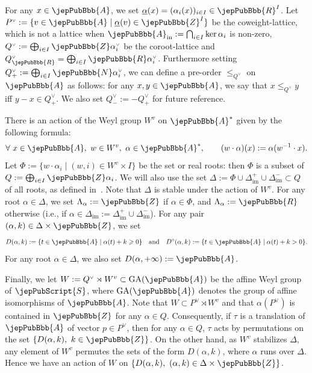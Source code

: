 For any $x\in\jepPubBbb{A}$, we set $\underline{\alpha}(x)=(\alpha_i(x))_{i\in I}\in\jepPubBbb{R}^I$. Let $P^{\scriptscriptstyle\vee}:=\{v\in\jepPubBbb{A}\mid\underline{\alpha}(v)\in\jepPubBbb{Z}^I\}$ be the coweight-lattice, which is not a lattice when $\jepPubBbb{A}_{\mathrm{in}}:=\bigcap_{i\in I}\ker\alpha_i$ is non-zero, $Q^{\scriptscriptstyle\vee}:=\bigoplus_{i\in I}\jepPubBbb{Z}\alpha_i^{\scriptscriptstyle\vee}$ be the coroot-lattice and $Q^{\scriptscriptstyle\vee}_{\jepPubBbb{R}}=\bigoplus_{i\in I}\jepPubBbb{R}\alpha_i^{\scriptscriptstyle\vee}$. Furthermore setting $Q^{\scriptscriptstyle\vee}_+:=\bigoplus_{i\in I}\jepPubBbb{N}\alpha_i^{\scriptscriptstyle\vee}$, we can define a pre-order $\leqslant_{Q^{\scriptscriptstyle\vee}}$ on $\jepPubBbb{A}$ as follows: for any $x,y\in\jepPubBbb{A}$, we say that $x\leqslant_{Q^{\scriptscriptstyle\vee}}y$ iff $y-x\in Q^{\scriptscriptstyle\vee}_+$. We also set $Q^{\scriptscriptstyle\vee}_-:=-Q^{\scriptscriptstyle\vee}_+$ for future reference.

There is an action of the Weyl group $W^v$ on $\jepPubBbb{A}^*$ given by the following formula:
\[
\forall\ x\in\jepPubBbb{A},\ w\in W^v,\ \alpha\in\jepPubBbb{A}^*,\qquad(w\cdot\alpha)(x):=\alpha(w^{-1}\cdot x).
\]
Let $\Phi:=\{w\cdot\alpha_i\mid(w,i)\in W^v\times I\}$ be the set or real roots: then $\Phi$ is a subset of $Q:=\bigoplus_{i\in I}\jepPubBbb{Z}\alpha_i$. We will also use the set $\Delta:=\Phi\cup\Delta_{\mathrm{im}}^+\cup\Delta_{\mathrm{im}}^-\subset Q$ of all roots, as defined in~\cite{jep88refKac94}. Note that $\Delta$ is stable under the action of $W^v$. For any root $\alpha\in\Delta$, we set $\Lambda_\alpha:=\jepPubBbb{Z}$ if $\alpha\in\Phi$, and $\Lambda_\alpha:=\jepPubBbb{R}$ otherwise (i.e., if $\alpha\in\Delta_{\mathrm{im}}:=\Delta_{\mathrm{im}}^+\cup\Delta_{\mathrm{im}}^-$). For any pair $(\alpha,k)\in\Delta\times\jepPubBbb{Z}$, we set
\begin{equation}\label{jep88localHalfspaces}
D(\alpha,k):=\{t\in\jepPubBbb{A}\mid\alpha(t)+k\geqslant0\}\quad\text{and}\quad D^\circ(\alpha,k):=\{t\in\jepPubBbb{A}\mid\alpha(t)+k>0\}.
\end{equation}
For any root $\alpha\in\Delta$, we also set $D(\alpha,+\infty):=\jepPubBbb{A}$.

Finally, we let $W:=Q^{\scriptscriptstyle\vee}\rtimes W^v\subset\mathrm{GA}(\jepPubBbb{A})$ be the affine Weyl group of $\jepPubScript{S}$, where $\mathrm{GA}(\jepPubBbb{A})$ denotes the group of affine isomorphisms of $\jepPubBbb{A}$. Note that $W\subset P^{\scriptscriptstyle\vee}\rtimes W^v$ and that $\alpha(P^{\scriptscriptstyle\vee})$ is contained in $\jepPubBbb{Z}$ for any $\alpha\in Q$. Consequently, if $\tau$ is a translation of $\jepPubBbb{A}$ of vector $p\in P^{\scriptscriptstyle\vee}$, then for any $\alpha\in Q$, $\tau$ acts by permutations on the set $\{D(\alpha,k),\ k\in\jepPubBbb{Z}\}$. On the other hand, as $W^v$ stabilizes $\Delta$, any element of $W^v$ permutes the sets of the form $D(\alpha,k)$, where $\alpha$ runs over $\Delta$. Hence we have an action of $W$ on $\{D(\alpha,k),\ (\alpha,k)\in\Delta\times\jepPubBbb{Z}\}$.

